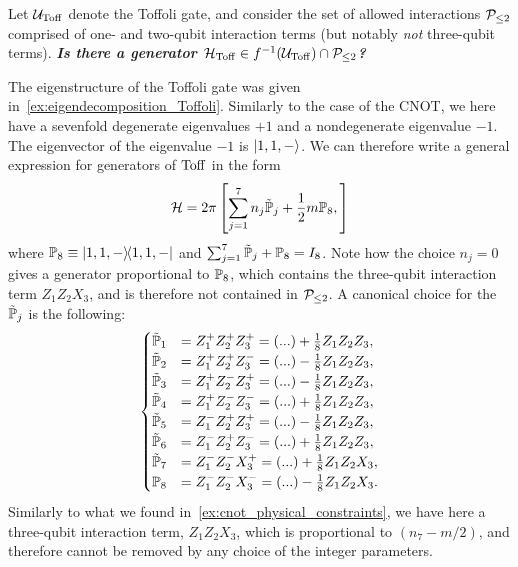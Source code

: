 \begin{example}[label={ex:toffoli_physical_constraints}]
Let $\mathcal{U}_{\operatorname{Toff}}$ denote the Toffoli gate, and consider the set of allowed interactions $\mathcal{P}_{\le2}$ comprised of one- and two-qubit interaction terms (but notably \textit{not} three-qubit terms).
\textbf{\textit{Is there a generator $\mathcal{H}_{\operatorname{Toff}}\in f^{-1}(\mathcal{U}_{\operatorname{Toff}})\cap\mathcal{P}_{\le2}$?}}

The eigenstructure of the Toffoli gate was given in~\cref{ex:eigendecomposition_Toffoli}. Similarly to the case of the CNOT, we here have a sevenfold degenerate eigenvalues $+1$ and a nondegenerate eigenvalue $-1$.
The eigenvector of the eigenvalue $-1$ is $\ket{1,1,-}$. We can therefore write a general expression for generators of $\operatorname{Toff}$ in the form
\begin{equation}
    \mathcal{H}=2\pi \left[
        \sum_{j=1}^7 n_j \tilde{\mathbb{P}}_j
        +\frac12 m\mathbb{P}_8,
    \right]
\end{equation}
where $\mathbb{P}_8\equiv\ketbra{1,1,-}$ and $\sum_{j=1}^7\tilde{\mathbb{P}}_j+\mathbb{P}_8=I_8$.
Note how the choice $n_j=0$ gives a generator proportional to $\mathbb{P}_8$, which contains the three-qubit interaction term $Z_1 Z_2 X_3$, and is therefore not contained in $\mathcal{P}_{\le2}$.
A canonical choice for the $\tilde{\mathbb{P}}_j$ is the following:
\begin{equation}
\begin{cases}
    \tilde{\mathbb{P}}_1 &= Z_1^+ Z_2^+ Z_3^+ = (...) + \frac18 Z_1 Z_2 Z_3, \\
    \tilde{\mathbb{P}}_2 &= Z_1^+ Z_2^+ Z_3^- = (...) - \frac{1}{8} Z_1 Z_2 Z_3, \\
    \tilde{\mathbb{P}}_3 &= Z_1^+ Z_2^- Z_3^+ = (...) - \frac18 Z_1 Z_2 Z_3, \\
    \tilde{\mathbb{P}}_4 &= Z_1^+ Z_2^- Z_3^- = (...) + \frac18 Z_1 Z_2 Z_3, \\
    \tilde{\mathbb{P}}_5 &= Z_1^- Z_2^+ Z_3^+ = (...) - \frac18 Z_1 Z_2 Z_3, \\
    \tilde{\mathbb{P}}_6 &= Z_1^- Z_2^+ Z_3^- = (...) + \frac18 Z_1 Z_2 Z_3, \\
    \tilde{\mathbb{P}}_7 &= Z_1^- Z_2^- X_3^+ = (...) + \frac18 Z_1 Z_2 X_3, \\
    \mathbb{P}_8 &= Z_1^- Z_2^- X_3^- = (...) - \frac18 Z_1 Z_2 X_3.
\end{cases}
\end{equation}
Similarly to what we found in~\cref{ex:cnot_physical_constraints}, we have here a three-qubit interaction term, $Z_1 Z_2 X_3$, which is proportional to $(n_7 - m/2)$, and therefore cannot be removed by any choice of the integer parameters.

\end{example}
